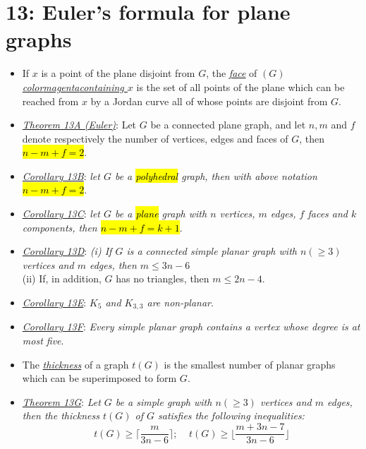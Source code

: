 \documentclass[12pt,a4paper, twocolumn]{article}
\begin{document}
\section*{13: Euler's formula for plane graphs}
\begin{itemize}
		\item If $x$ is a point of the plane disjoint from $G$, the \underline{\emph{\color{magenta}face}} of $(G)$ \underline{\emph{color{magenta}containing $x$}} is the set of all points of the plane which can be reached from $x$ by a Jordan curve all of whose points are disjoint from $G$.
		\item \underline{\emph{\color{magenta}Theorem 13A (Euler)}}: Let $G$ be a connected plane graph, and let $n, m$ and $f$ denote respectively the number of vertices, edges and faces of $G$, then \hl{$n - m + f = 2$}.
		\item \underline{\emph{\color{magenta}Corollary 13B}}: \emph{let $G$ be a \hl{polyhedral} graph, then with above notation \hl{$n - m + f = 2$}}.
		\item \underline{\emph{\color{magenta}Corollary 13C}}: \emph{let $G$ be a \hl{plane} graph with $n$ vertices, $m$ edges, $f$ faces and $k$ components, then \hl{$n - m + f = k + 1$}}.
		\item \underline{\emph{\color{magenta}Corollary 13D}}: \emph{(i) If $G$ is a connected simple planar graph with $n(\geq 3)$ vertices and $m$ edges, then $m \leq 3n -6$}\\ (ii) If, in addition, $G$ has no triangles, then $m \leq 2n -4$.
		\item \underline{\emph{\color{magenta}Corollary 13E}}: \emph{$K_5$ and $K_{3,3}$ are non-planar}.
		\item \underline{\emph{\color{magenta}Corollary 13F}}: \emph{Every simple planar graph contains a vertex whose degree is at most five}.
		\item The \underline{\emph{\color{magenta}thickness}} of a graph $t(G)$ is the smallest number of planar graphs which can be superimposed to form $G$.
		\item \underline{\emph{\color{magenta}Theorem 13G}}: \emph{Let $G$ be a simple graph with $n(\geq 3)$ vertices and $m$ edges, then the thickness $t(G)$ of $G$ satisfies the following inequalities:
						$$t(G) \geq \big \lceil \frac{m}{3n -6} \big \rceil; \ \ \ \ \ t(G) \geq \big \lfloor \frac{m + 3n -7}{3n -6} \big \rfloor $$
				}		
\end{itemize}
\end{document}
